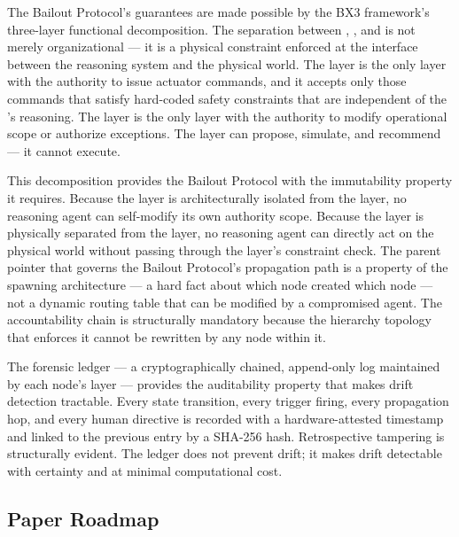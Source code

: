 The Bailout Protocol's guarantees are made possible by the BX3 framework's three-layer functional decomposition. The separation between \purpose, \bounds, and \fact is not merely organizational — it is a physical constraint enforced at the interface between the reasoning system and the physical world. The \fact layer is the only layer with the authority to issue actuator commands, and it accepts only those commands that satisfy hard-coded safety constraints that are independent of the \bounds's reasoning. The \purpose layer is the only layer with the authority to modify operational scope or authorize exceptions. The \bounds layer can propose, simulate, and recommend — it cannot execute.

This decomposition provides the Bailout Protocol with the immutability property it requires. Because the \purpose layer is architecturally isolated from the \bounds layer, no reasoning agent can self-modify its own authority scope. Because the \fact layer is physically separated from the \bounds layer, no reasoning agent can directly act on the physical world without passing through the \fact layer's constraint check. The parent pointer that governs the Bailout Protocol's propagation path is a property of the spawning architecture — a hard fact about which node created which node — not a dynamic routing table that can be modified by a compromised agent. The accountability chain is structurally mandatory because the hierarchy topology that enforces it cannot be rewritten by any node within it.

The forensic ledger — a cryptographically chained, append-only log maintained by each node's \fact layer — provides the auditability property that makes drift detection tractable. Every state transition, every trigger firing, every propagation hop, and every human directive is recorded with a hardware-attested timestamp and linked to the previous entry by a SHA-256 hash. Retrospective tampering is structurally evident. The ledger does not prevent drift; it makes drift detectable with certainty and at minimal computational cost.

\subsection{Paper Roadmap}

